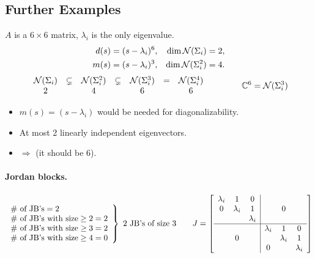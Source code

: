 \subsection{Further Examples}\label{ss:jordan-more}
\begin{example}
\leavevmode{}$A$ is a $6\times6$ matrix, $\lambda_i$ is the only eigenvalue.
\begin{align*}
d(s)&=(s-\lambda_i)^6, & \dim\mathcal{N}(\Sigma_i)&=2,\\
m(s)&=(s-\lambda_i)^3, & \dim\mathcal{N}(\Sigma_i^2)&=4.
\end{align*}
\[
\begin{array}{ccccccc}
\mathcal{N}(\Sigma_i)&\subsetneq&\mathcal{N}(\Sigma_i^2)&\subsetneq&\mathcal{N}(\Sigma_i^3)&=&\mathcal{N}(\Sigma_i^4)\\
2&&4&&6&&6
\end{array}
\qquad\qquad
\mathbb{C}^6=\mathcal{N}(\Sigma_i^3)
\]
\begin{itemize}[nosep]
\item $m(s)=(s-\lambda_i)$ would be needed for diagonalizability.
\item At most 2 linearly independent eigenvectors.
\item $\Rightarrow$  (it should be 6).
\end{itemize}
\paragraph{Jordan blocks.}
\[
\left.\begin{array}{l}
\#\text{ of JB's}=2\\
\#\text{ of JB's with size}\geq2=2\\
\#\text{ of JB's with size}\geq3=2\\
\#\text{ of JB's with size}\geq4=0
\end{array}\right\}\ \text{2 JB's of size 3}
\qquad
J=\left[\begin{array}{ccc|ccc}
\lambda_i&1&0&&&\\
0&\lambda_i&1&&0&\\
&&\lambda_i&&&\\\hline
&&&\lambda_i&1&0\\
&0&&&\lambda_i&1\\
&&&0&&\lambda_i
\end{array}\right]
\]


\end{example}
